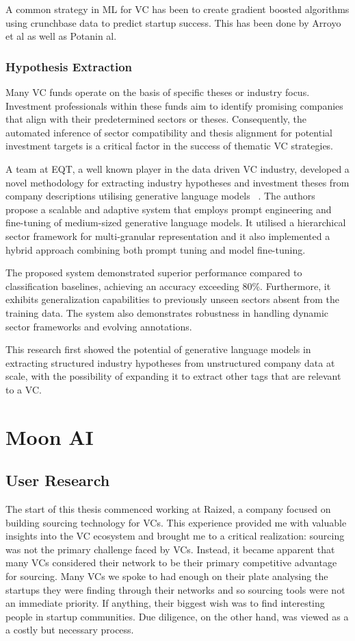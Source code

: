 \documentclass[a4paper, oneside]{discothesis}
\begin{document}
A common strategy in ML for VC has been to create gradient boosted algorithms using crunchbase data to predict startup success. This has been done by Arroyo et al as well as Potanin al. 


\subsection{Hypothesis Extraction}

Many VC funds operate on the basis of specific theses or industry focus. Investment professionals within these funds aim to identify promising companies that align with their predetermined sectors or theses. Consequently, the automated inference of sector compatibility and thesis alignment for potential investment targets is a critical factor in the success of thematic VC strategies.


A team at EQT, a well known player in the data driven VC industry, developed a novel methodology for extracting industry hypotheses and investment theses from company descriptions utilising generative language models ~\cite{lele_cao_infer_industry_sector}. The authors propose a scalable and adaptive system that employs prompt engineering and fine-tuning of medium-sized generative language models. It utilised a hierarchical sector framework for multi-granular representation and it also implemented a hybrid approach combining both prompt tuning and model fine-tuning.

The proposed system demonstrated superior performance compared to classification baselines, achieving an accuracy exceeding 80\%. Furthermore, it exhibits generalization capabilities to previously unseen sectors absent from the training data. The system also demonstrates robustness in handling dynamic sector frameworks and evolving annotations.

This research first showed the potential of generative language models in extracting structured industry hypotheses from unstructured company data at scale, with the possibility of expanding it to extract other tags that are relevant to a VC. 

\chapter{Moon AI}
\section{User Research}

The start of this thesis commenced working at Raized, a company focused on building sourcing technology for VCs. This experience provided me with valuable insights into the VC ecosystem and brought me to a critical realization: sourcing was not the primary challenge faced by VCs. Instead, it became apparent that many VCs considered their network to be their primary competitive advantage for sourcing. Many VCs we spoke to had enough on their plate analysing the startups they were finding through their networks and so sourcing tools were not an immediate priority. If anything, their biggest wish was to find interesting people in startup communities. Due diligence, on the other hand, was viewed as a a costly but necessary process.
\end{document}
